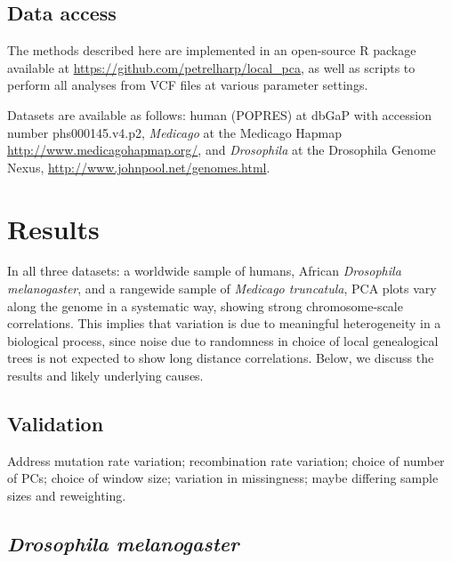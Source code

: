 \documentclass[11pt, oneside]{article}   	%
\begin{document}
\subsection{Data access}

The methods described here
are implemented in an open-source R package
available at \url{https://github.com/petrelharp/local_pca},
as well as scripts to perform all analyses from VCF files
at various parameter settings.

Datasets are available as follows:
human (POPRES) at dbGaP with accession number phs000145.v4.p2,
\textit{Medicago} at the Medicago Hapmap \url{http://www.medicagohapmap.org/},
and \textit{Drosophila} at the Drosophila Genome Nexus, \url{http://www.johnpool.net/genomes.html}.


\section{Results}

In all three datasets:
a worldwide sample of humans, African \textit{Drosophila melanogaster},
and a rangewide sample of \textit{Medicago truncatula},
PCA plots vary along the genome in a systematic way, showing strong chromosome-scale correlations.
This implies that variation is due to meaningful heterogeneity in a biological process,
since noise due to randomness in choice of local genealogical trees
is not expected to show long distance correlations. 
Below, we discuss the results and likely underlying causes.




\subsection{Validation}

Address
mutation rate variation;
recombination rate variation;
choice of number of PCs;
choice of window size;
variation in missingness;
maybe differing sample sizes and reweighting.


\subsection{\textit{Drosophila melanogaster}}
\end{document}
